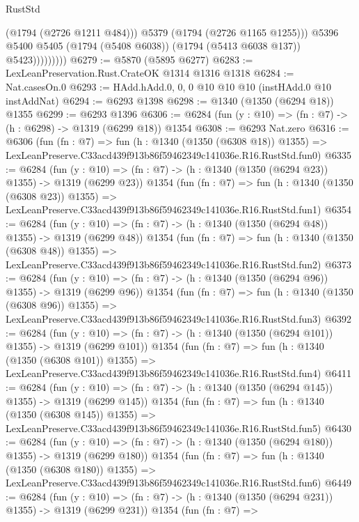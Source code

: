 \begin{lexlean}{RustStd}
\begin{coremodule}
                          (@1794 (@2726 @1211 @484)))
                        @5379
                        (@1794 (@2726 @1165 @1255)))
                      @5396
                      @5400
                      @5405
                      (@1794 (@5408 @6038))
                      (@1794 (@5413 @6038 @137))
                      @5423)))))))))
@6279 := @5870 (@5895 @6277)
@6283 := LexLeanPreservation.Rust.CrateOK @1314 @1316 @1318
@6284 := Nat.casesOn.{0}
@6293 := HAdd.hAdd.{0, 0, 0} @10 @10 @10 (instHAdd.{0} @10 instAddNat)
@6294 := @6293 @1398
@6298 := @1340 (@1350 (@6294 @18)) @1355
@6299 := @6293 @1396
@6306 := @6284 (fun (y : @10) => (fn : @7) -> (h : @6298) -> @1319 (@6299 @18)) @1354
@6308 := @6293 Nat.zero
@6316 := @6306
    (fun (fn : @7) =>
    fun (h : @1340 (@1350 (@6308 @18)) @1355) =>
    LexLeanPreserve.C33acd439f913b86f59462349c141036e.R16.RustStd.fun0)
@6335 := @6284
    (fun (y : @10) => (fn : @7) -> (h : @1340 (@1350 (@6294 @23)) @1355) -> @1319 (@6299 @23))
    @1354
    (fun (fn : @7) =>
    fun (h : @1340 (@1350 (@6308 @23)) @1355) =>
    LexLeanPreserve.C33acd439f913b86f59462349c141036e.R16.RustStd.fun1)
@6354 := @6284
    (fun (y : @10) => (fn : @7) -> (h : @1340 (@1350 (@6294 @48)) @1355) -> @1319 (@6299 @48))
    @1354
    (fun (fn : @7) =>
    fun (h : @1340 (@1350 (@6308 @48)) @1355) =>
    LexLeanPreserve.C33acd439f913b86f59462349c141036e.R16.RustStd.fun2)
@6373 := @6284
    (fun (y : @10) => (fn : @7) -> (h : @1340 (@1350 (@6294 @96)) @1355) -> @1319 (@6299 @96))
    @1354
    (fun (fn : @7) =>
    fun (h : @1340 (@1350 (@6308 @96)) @1355) =>
    LexLeanPreserve.C33acd439f913b86f59462349c141036e.R16.RustStd.fun3)
@6392 := @6284
    (fun (y : @10) => (fn : @7) -> (h : @1340 (@1350 (@6294 @101)) @1355) -> @1319 (@6299 @101))
    @1354
    (fun (fn : @7) =>
    fun (h : @1340 (@1350 (@6308 @101)) @1355) =>
    LexLeanPreserve.C33acd439f913b86f59462349c141036e.R16.RustStd.fun4)
@6411 := @6284
    (fun (y : @10) => (fn : @7) -> (h : @1340 (@1350 (@6294 @145)) @1355) -> @1319 (@6299 @145))
    @1354
    (fun (fn : @7) =>
    fun (h : @1340 (@1350 (@6308 @145)) @1355) =>
    LexLeanPreserve.C33acd439f913b86f59462349c141036e.R16.RustStd.fun5)
@6430 := @6284
    (fun (y : @10) => (fn : @7) -> (h : @1340 (@1350 (@6294 @180)) @1355) -> @1319 (@6299 @180))
    @1354
    (fun (fn : @7) =>
    fun (h : @1340 (@1350 (@6308 @180)) @1355) =>
    LexLeanPreserve.C33acd439f913b86f59462349c141036e.R16.RustStd.fun6)
@6449 := @6284
    (fun (y : @10) => (fn : @7) -> (h : @1340 (@1350 (@6294 @231)) @1355) -> @1319 (@6299 @231))
    @1354
    (fun (fn : @7) =>

\end{coremodule}
\end{lexlean}
